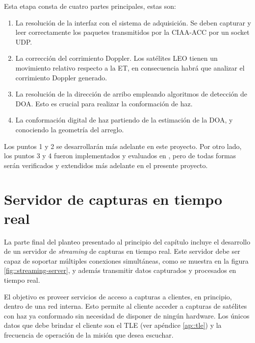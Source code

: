 \documentclass[../../main.tex]{subfiles}
\begin{document}
Esta etapa consta de cuatro partes principales, estas son:
\begin{enumerate}
    \item La resolución de la interfaz con el sistema de adquisición. Se deben capturar y leer correctamente los paquetes transmitidos por la CIAA-ACC por un socket UDP.
    \item La corrección del corrimiento Doppler. Los satélites LEO tienen un movimiento relativo respecto a la ET, en consecuencia habrá que analizar el corrimiento Doppler generado.
    \item La resolución de la dirección de arribo empleando algoritmos de detección de DOA. Esto es crucial para realizar la conformación de haz.
    \item La conformación digital de haz partiendo de la estimación de la DOA, y conociendo la geometría del arreglo.
\end{enumerate}

Los puntos 1 y 2 se desarrollarán más adelante en este proyecto. Por otro lado, los puntos 3 y 4 fueron implementados y evaluados en \cite{proyecto-grigo}, pero de todas formas serán verificados y extendidos más adelante en el presente proyecto.

\section{Servidor de capturas en tiempo real}
La parte final del planteo presentado al principio del capítulo incluye el desarrollo de un servidor de \textit{streaming} de capturas en tiempo real. Este servidor debe ser capaz de soportar múltiples conexiones simultáneas, como se muestra en la figura \ref{fig::streaming-server}, y además transmitir datos capturados y procesados en tiempo real. 

El objetivo es proveer servicios de acceso a capturas a clientes, en principio, dentro de una red interna. Esto permite al cliente acceder a capturas de satélites con haz ya conformado sin necesidad de disponer de ningún hardware. Los únicos datos que debe brindar el cliente son el TLE (ver apéndice \ref{ap::tle}) y la frecuencia de operación de la misión que desea escuchar. 

\end{document}
